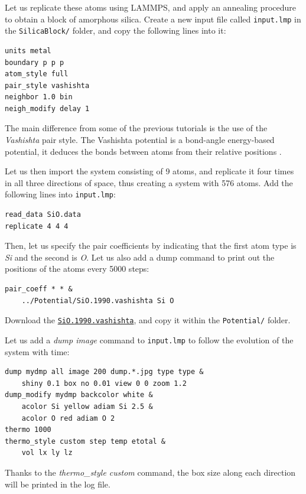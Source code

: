 \documentclass[9pt,tutorial]{livecoms}
\newcommand{\flrcmd}[1]{\textcolor{command}{\texttt{#1}}} %
\newcommand{\flecmd}[1]{\textcolor{command}{\texttt{#1}}} %
\newcommand{\dwlcmd}[1]{\textcolor{download}{\texttt{#1}}} %
\newcommand{\filepath}{https://raw.githubusercontent.com/lammpstutorials/lammpstutorials-article/main/files/}
\begin{document}
Let us replicate these atoms using LAMMPS, and apply an annealing procedure to
obtain a block of amorphous silica. Create a new input file called \flecmd{input.lmp}
in the \flrcmd{SilicaBlock/} folder, and copy
the following lines into it:
\begin{lstlisting}
units metal
boundary p p p
atom_style full
pair_style vashishta
neighbor 1.0 bin
neigh_modify delay 1
\end{lstlisting}
The main difference from some of the previous tutorials is the use of the \textit{Vashishta}
pair style. The Vashishta potential is a bond-angle energy-based potential, it deduces
the bonds between atoms from their relative positions \cite{vashishta1990interaction}.

Let us then import the system consisting of 9 atoms, and replicate it four times
in all three directions of space, thus creating a system with 576 atoms. Add the
following lines into \flecmd{input.lmp}:
\begin{lstlisting}
read_data SiO.data
replicate 4 4 4
\end{lstlisting}
Then, let us specify the pair coefficients by indicating that the first atom type
is \textit{Si} and the second is \textit{O}. Let us also add a dump command to
print out the positions of the atoms every 5000 steps:
\begin{lstlisting}
pair_coeff * * &
    ../Potential/SiO.1990.vashishta Si O
\end{lstlisting}
Download the \href{\filepath tutorial6/SiO.1990.vashishta}{\dwlcmd{SiO.1990.vashishta}},
and copy it within the \flrcmd{Potential/} folder.

Let us add a \textit{dump image} command to \flecmd{input.lmp} to follow the
evolution of the system with time:
\begin{lstlisting}
dump mydmp all image 200 dump.*.jpg type type &
    shiny 0.1 box no 0.01 view 0 0 zoom 1.2
dump_modify mydmp backcolor white &
    acolor Si yellow adiam Si 2.5 &
    acolor O red adiam O 2
thermo 1000
thermo_style custom step temp etotal &
    vol lx ly lz
\end{lstlisting}
Thanks to the \textit{thermo\_style custom} command, the box size along each direction
will be printed in the log file.
\end{document}
